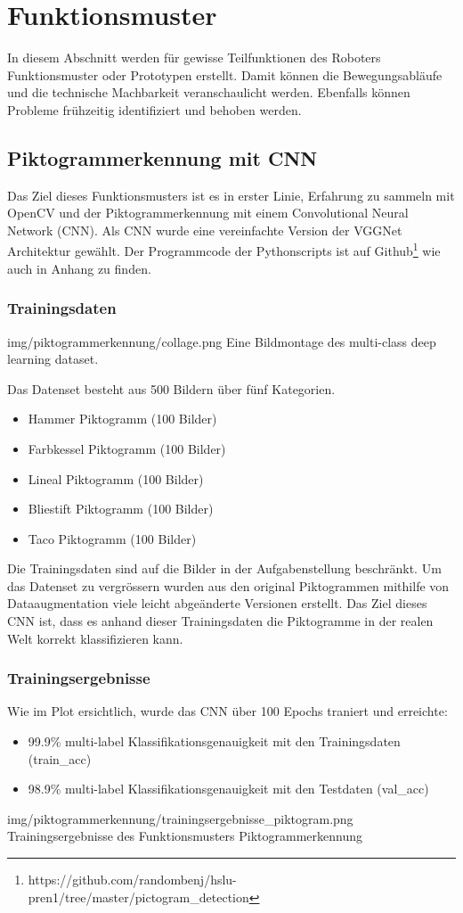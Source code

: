 \newpage
\section{Funktionsmuster}
In diesem Abschnitt werden für gewisse Teilfunktionen des Roboters Funktionsmuster oder Prototypen erstellt. Damit können die Bewegungsabläufe und die technische Machbarkeit veranschaulicht werden. Ebenfalls können Probleme frühzeitig identifiziert und behoben werden.
\subsection{Piktogrammerkennung mit CNN}
\label{piktogrammerkennungMitCNN}
Das Ziel dieses Funktionsmusters ist es in erster Linie, Erfahrung zu sammeln mit OpenCV und der Piktogrammerkennung mit einem Convolutional Neural Network (CNN). Als CNN wurde eine vereinfachte Version der VGGNet Architektur gewählt.
Der Programmcode der Pythonscripts ist auf Github\footnote{https://github.com/randombenj/hslu-pren1/tree/master/pictogram\_detection} wie auch in Anhang zu finden.

\subsubsection{Trainingsdaten}
\image
   {img/piktogrammerkennung/collage.png}
   {Eine Bildmontage des multi-class deep learning dataset.}
   
Das Datenset besteht aus 500 Bildern über fünf Kategorien.
\begin{itemize}
    \item Hammer Piktogramm (100 Bilder)
    \item Farbkessel Piktogramm (100 Bilder)
    \item Lineal Piktogramm (100 Bilder)
    \item Bliestift Piktogramm (100 Bilder)
    \item Taco Piktogramm (100 Bilder)
 \end{itemize}
 
Die Trainingsdaten sind auf die Bilder in der Aufgabenstellung beschränkt. Um das Datenset zu vergrössern wurden aus den original Piktogrammen mithilfe von Dataaugmentation viele leicht abgeänderte Versionen erstellt. Das Ziel dieses CNN ist, dass es anhand dieser Trainingsdaten die Piktogramme in der realen Welt korrekt klassifizieren kann.

\subsubsection{Trainingsergebnisse}
Wie im Plot ersichtlich, wurde das CNN über 100 Epochs traniert und erreichte:
\begin{itemize}
    \item 99.9\% multi-label Klassifikationsgenauigkeit mit den Trainingsdaten (train\_acc)
    \item 98.9\% multi-label Klassifikationsgenauigkeit mit den Testdaten (val\_acc)
 \end{itemize}
 \image
   {img/piktogrammerkennung/trainingsergebnisse_piktogram.png}
   {Trainingsergebnisse des Funktionsmusters Piktogrammerkennung}
   
